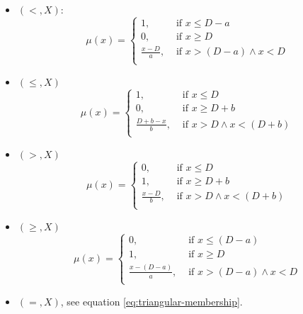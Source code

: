 \documentclass{llncs}
\begin{document}
\begin{itemize}
 \item $\left(<, X \right)$:
	\begin{equation}
	 \label{eq:ikc-lt}
	  \mu\left(x \right) =
	      \begin{cases}
			  1, & \mbox{ if } x \leq D-a\\
			  0, & \mbox{ if } x \geq D\\
			  \frac{x-D}{a} , & \mbox{ if } x > \left(D-a \right) \wedge x< D\\			  
			  \end{cases}
	\end{equation}
\item $\left(\leq, X \right)$
	\begin{equation}
		\label{eq:ikc-leq}
		  \mu\left(x \right) =
		      \begin{cases}
				  1, & \mbox{ if } x \leq D\\
				  0, & \mbox{ if } x \geq D+b\\
				  \frac{D+b-x}{b} , & \mbox{ if } x > D \wedge x< \left(D+b\right)\\			  
				  \end{cases}
		\end{equation}
\item $\left(>, X \right)$
	\begin{equation}
		\label{eq:ikc-gt}
		  \mu\left(x \right) =
		      \begin{cases}
				  0, & \mbox{ if } x \leq D\\
				  1, & \mbox{ if } x \geq D+b\\
				  \frac{x-D}{b} , & \mbox{ if } x > D \wedge x< \left(D+b\right)\\			  
				  \end{cases}
		\end{equation}

\item $\left(\geq, X \right)$
	\begin{equation}
		\label{eq:ikc-geq}
		  \mu\left(x \right) =
		      \begin{cases}
				  0, & \mbox{ if } x \leq \left(D-a \right)\\
				  1, & \mbox{ if } x \geq D\\
				  \frac{x-\left(D-a\right)}{a} , & \mbox{ if } x > \left(D-a\right) \wedge x< D\\			  
				  \end{cases}
		\end{equation}
\item $\left(=, X \right)$, see equation \eqref{eq:triangular-membership}.


\end{itemize}
\end{document}
